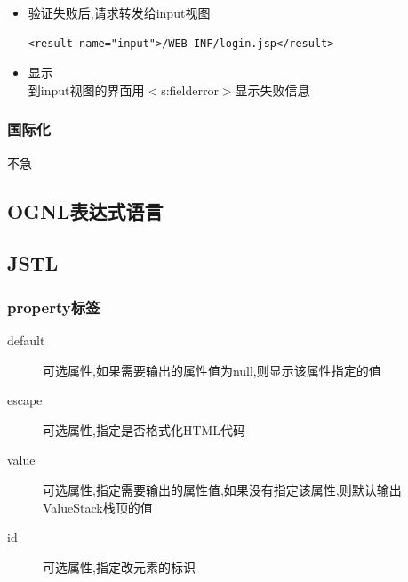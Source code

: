 \begin{itemize}
\begin{itemize}
\item 验证失败后,请求转发给input视图
\begin{lstlisting}[style=JAVA]
<result name="input">/WEB-INF/login.jsp</result>
\end{lstlisting}
\item 显示\\
到input视图的界面用$<$s:fielderror$>$显示失败信息

\end{itemize}
\end{itemize}


\subsubsection{国际化}
不急


\subsection{OGNL表达式语言}


\subsection{JSTL}
\subsubsection{property标签}
\begin{description}
\item[default]	可选属性,如果需要输出的属性值为null,则显示该属性指定的值
\item[escape]	可选属性,指定是否格式化HTML代码
\item[value]		可选属性,指定需要输出的属性值,如果没有指定该属性,则默认输出ValueStack栈顶的值
\item[id]	可选属性,指定改元素的标识
\end{description}

